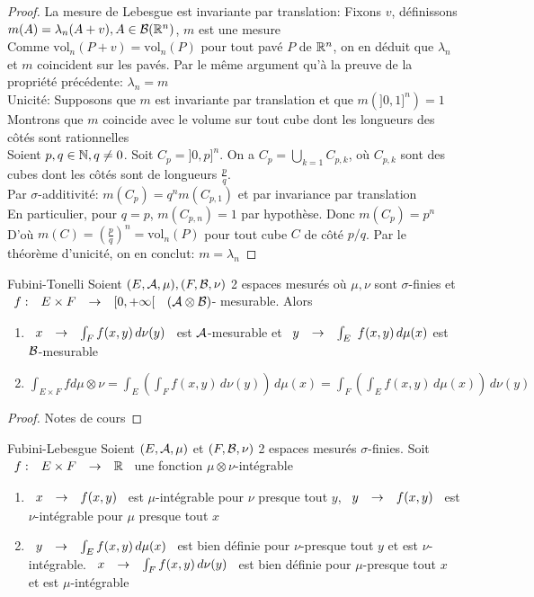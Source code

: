 \documentclass[]{report}
\begin{document}
    \begin{proof}
        La mesure de Lebesgue est invariante par translation: Fixons $v$, définissons $m(A)=\lambda_n(A+v),A\in\mathcal{B}(\mathbb{R}^n)$, $m$ est une mesure\\
        Comme $\text{vol}_n(P+v)=\text{vol}_n(P)$ pour tout pavé $P$ de $\mathbb{R}^n$, on en déduit que $\lambda_n$ et $m$ coincident sur les pavés. Par le même argument qu'à la preuve de la propriété précédente: $\lambda_n=m$\\
        Unicité: Supposons que $m$ est invariante par translation et que $m(]0,1]^n)=1$\\
        Montrons que $m$ coincide avec le volume sur tout cube dont les longueurs des côtés sont rationnelles\\
        Soient $p,q\in\mathbb{N},q\neq 0$. Soit $C_p=]0,p]^n$. On a $C_p=\bigcup_{k=1}C_{p,k}$, où $C_{p,k}$ sont des cubes dont les côtés sont de longueurs $\frac{p}{q}$.\\
        Par $\sigma$-additivité: $m(C_p)=q^n m(C_{p,1})$ et par invariance par translation\\
        En particulier, pour $q=p$, $m(C_{p,n})=1$ par hypothèse. Donc $m(C_p)=p^n$\\
        D'où $m(C)=\left(\frac{p}{q}\right)^n=\text{vol}_n(P)$ pour tout cube $C$ de côté $p/q$. Par le théorème d'unicité, on en conclut: $m=\lambda_n$
    \end{proof}

    \begin{tm}{Fubini-Tonelli}{}
        Soient $(E,\mathcal{A},\mu),(F,\mathcal{B},\nu)$ 2 espaces mesurés où $\mu,\nu$ sont $\sigma$-finies et $\begin{array}{ccccc} f : & E\times F & \to & [0,+\infty[ \end{array}$ $(\mathcal{A}\otimes\mathcal{B})$- mesurable. Alors
        \begin{enumerate}
            \item $\begin{array}{ccccc} x & \to & \int_F f(x,y)\,d\nu(y) \end{array}$ est $\mathcal{A}$-mesurable et $\begin{array}{ccccc} y & \to & \int_E \end{array} f(x,y)\,d\mu(x)$ est $\mathcal{B}$-mesurable
            \item $\int_{E\times F} f d\mu\otimes\nu=\int_E(\int_F f(x,y)\,d\nu(y))\,d\mu(x)=\int_F(\int_E f(x,y)\,d\mu(x))\,d\nu(y)$
        \end{enumerate}
    \end{tm}

    \begin{proof}
        Notes de cours
    \end{proof}

    \begin{tm}{Fubini-Lebesgue}{}
        Soient $(E,\mathcal{A},\mu)$ et $(F,\mathcal{B},\nu)$ 2 espaces mesurés $\sigma$-finies. Soit $\begin{array}{ccccc} f : & E\times F & \to & \mathbb{R} \end{array}$ une fonction $\mu\otimes\nu$-intégrable
        \begin{enumerate}
            \item $\begin{array}{ccccc} x & \to & f(x,y) \end{array}$ est $\mu$-intégrable pour $\nu$ presque tout $y$, $\begin{array}{ccccc} y & \to & f(x,y) \end{array}$ est $\nu$-intégrable pour $\mu$ presque tout $x$
            \item $\begin{array}{ccccc} y & \to & \int_E f(x,y)\,d\mu(x) \end{array}$ est bien définie pour $\nu$-presque tout $y$ et est $\nu$-intégrable. $\begin{array}{ccccc} x & \to & \int_F f(x,y)\,d\nu(y) \end{array}$ est bien définie pour $\mu$-presque tout $x$ et est $\mu$-intégrable
        \end{enumerate}
    \end{tm}
\end{document}
